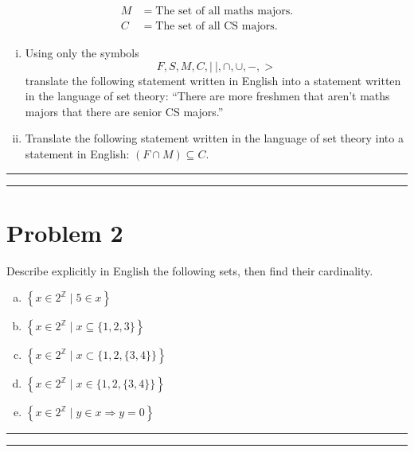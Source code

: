 \documentclass{article}
\theoremstyle{definition}
\newenvironment{solution}{\bigskip\hrule{\hfill}}{\bigskip\hrule{\hfill}} %
\begin{document}
\begin{enumerate}[a)]
\begin{align*}
        M & = \text{The set of all maths majors}. \\
        C & = \text{The set of all CS majors}. 
    \end{align*}
    \begin{enumerate}[i.] %
        \item Using only the symbols $$F,S,M,C,\left|~\right|,\cap,\cup,-,>$$ translate the following statement written in English into a statement written in the language of set theory: ``There are more freshmen that aren't maths majors that there are senior CS majors.''
        \item Translate the following statement written in the language of set theory into a statement in English: $\left(F\cap M\right)\subseteq C$.
    \end{enumerate}
\end{enumerate}
\begin{solution}


\end{solution}


\newpage


\section*{Problem 2}
Describe explicitly in English the following sets, then find their cardinality.
\begin{enumerate}[a)] %
    \item $\left\{x\in 2^{\mathbb{Z}}\mid 5\in x\right\}$
    \item $\left\{x\in 2^{\mathbb{Z}}\mid x\subseteq\{1,2,3\}\right\}$
    \item $\left\{x\in 2^{\mathbb{Z}}\mid x\subset\{1,2,\{3,4\}\}\right\}$
    \item $\left\{x\in 2^{\mathbb{Z}}\mid x\in\{1,2,\{3,4\}\}\right\}$
    \item $\left\{x\in 2^{\mathbb{Z}}\mid y\in x\Longrightarrow y=0\right\}$
\end{enumerate}
\begin{solution}


\end{solution}
\end{document}
